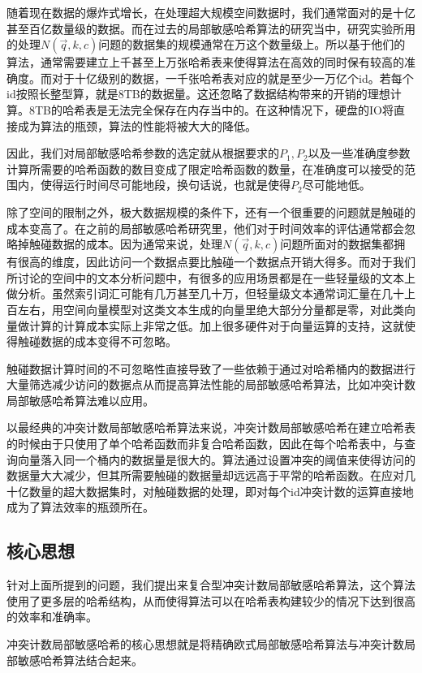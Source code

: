 随着现在数据的爆炸式增长，在处理超大规模空间数据时，我们通常面对的是十亿甚至百亿数量级的数据。而在过去的局部敏感哈希算法的研究当中，研究实验所用的处理$ N(\vec{q},k,c) $问题的数据集的规模通常在万这个数量级上。所以基于他们的算法，通常需要建立上千甚至上万张哈希表来使得算法在高效的同时保有较高的准确度。而对于十亿级别的数据，一千张哈希表对应的就是至少一万亿个id。若每个id按照长整型算，就是8TB的数据量。这还忽略了数据结构带来的开销的理想计算。8TB的哈希表是无法完全保存在内存当中的。在这种情况下，硬盘的IO将直接成为算法的瓶颈，算法的性能将被大大的降低。

因此，我们对局部敏感哈希参数的选定就从根据要求的$ P_1,P_2 $以及一些准确度参数计算所需要的哈希函数的数目变成了限定哈希函数的数量，在准确度可以接受的范围内，使得运行时间尽可能地段，换句话说，也就是使得$ P_2 $尽可能地低。

除了空间的限制之外，极大数据规模的条件下，还有一个很重要的问题就是触碰的成本变高了。在之前的局部敏感哈希研究里，他们对于时间效率的评估通常都会忽略掉触碰数据的成本。因为通常来说，处理$ N(\vec{q},k,c) $问题所面对的数据集都拥有很高的维度，因此访问一个数据点要比触碰一个数据点开销大得多。而对于我们所讨论的空间中的文本分析问题中，有很多的应用场景都是在一些轻量级的文本上做分析。虽然索引词汇可能有几万甚至几十万，但轻量级文本通常词汇量在几十上百左右，用空间向量模型对这类文本生成的向量里绝大部分分量都是零，对此类向量做计算的计算成本实际上非常之低。加上很多硬件对于向量运算的支持，这就使得触碰数据的成本变得不可忽略。

触碰数据计算时间的不可忽略性直接导致了一些依赖于通过对哈希桶内的数据进行大量筛选减少访问的数据点从而提高算法性能的局部敏感哈希算法，比如冲突计数局部敏感哈希算法难以应用。

以最经典的冲突计数局部敏感哈希算法来说，冲突计数局部敏感哈希在建立哈希表的时候由于只使用了单个哈希函数而非复合哈希函数，因此在每个哈希表中，与查询向量落入同一个桶内的数据量是很大的。算法通过设置冲突的阈值来使得访问的数据量大大减少，但其所需要触碰的数据量却远远高于平常的哈希函数。在应对几十亿数量的超大数据集时，对触碰数据的处理，即对每个id冲突计数的运算直接地成为了算法效率的瓶颈所在。

\subsection{核心思想}

针对上面所提到的问题，我们提出来复合型冲突计数局部敏感哈希算法，这个算法使用了更多层的哈希结构，从而使得算法可以在哈希表构建较少的情况下达到很高的效率和准确率。

冲突计数局部敏感哈希的核心思想就是将精确欧式局部敏感哈希算法与冲突计数局部敏感哈希算法结合起来。

